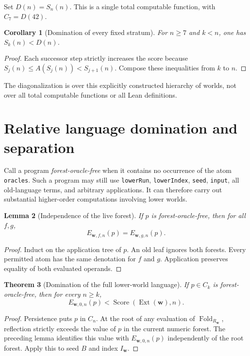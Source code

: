 \documentclass[11pt]{article}
\newtheorem{theorem}{Theorem}[section]
\newtheorem{lemma}[theorem]{Lemma}
\newtheorem{corollary}[theorem]{Corollary}
\theoremstyle{definition}
\theoremstyle{remark}
\newcommand{\Score}{\operatorname{Score}}
\newcommand{\Ext}{\operatorname{Ext}}
\newcommand{\code}[1]{\texttt{#1}}
\newcommand{\ctx}{\boldsymbol w}
\begin{document}
Set $D(n)=S_n(n)$. This is a single total computable function, with
$C_7=D(42)$.

\begin{corollary}[Domination of every fixed stratum]
For $n\ge7$ and $k<n$, one has $S_k(n)<D(n)$.
\end{corollary}
\begin{proof}
Each successor step strictly increases the score because
$S_j(n)\le A(S_j(n))<S_{j+1}(n)$. Compose these inequalities from $k$ to $n$.
\end{proof}

The diagonalization is over this explicitly constructed hierarchy of worlds,
not over all total computable functions or all Lean definitions.

\section{Relative language domination and separation}\label{sec:separation}

Call a program \emph{forest-oracle-free} when it contains no occurrence of
the atom \code{oracles}. Such a program may still use \code{lowerRun},
\code{lowerIndex}, \code{seed}, \code{input}, all old-language terms, and
arbitrary applications. It can therefore carry out substantial higher-order
computations involving lower worlds.

\begin{lemma}[Independence of the live forest]
If $p$ is forest-oracle-free, then for all $f,g$,
\[
                    E_{\ctx,f,n}(p)=E_{\ctx,g,n}(p).
\]
\end{lemma}
\begin{proof}
Induct on the application tree of $p$. An old leaf ignores both forests.
Every permitted atom has the same denotation for $f$ and $g$. Application
preserves equality of both evaluated operands.
\end{proof}

\begin{theorem}[Domination of the full lower-world language]\label{thm:lang}
If $p\in C_k$ is forest-oracle-free, then for every $n\ge k$,
\[
               E_{\ctx,0,n}(p)<\Score(\Ext(\ctx),n).
\]
\end{theorem}
\begin{proof}
Persistence puts $p$ in $C_n$. At the root of any evaluation of
$\operatorname{Fold}_{R_{\ctx}}$, reflection strictly exceeds the value of
$p$ in the current numeric forest. The preceding lemma identifies this value
with $E_{\ctx,0,n}(p)$ independently of the root forest. Apply this to seed
$B$ and index $I_{\ctx}$.
\end{proof}
\end{document}
